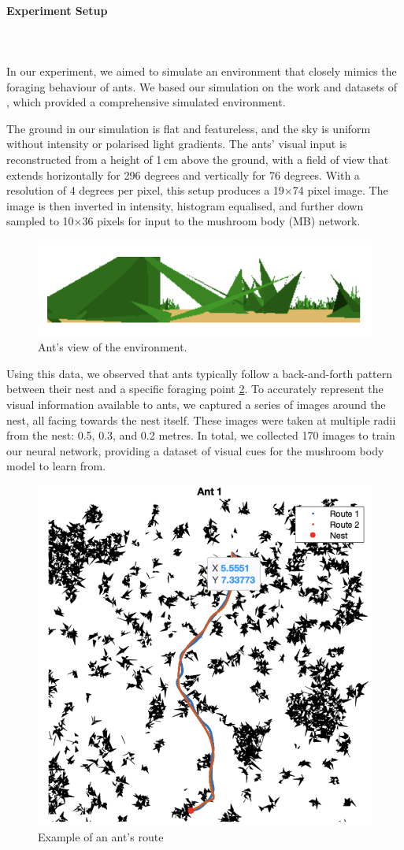 \documentclass[12pt,a4paper]{article}
\begin{document}
\paragraph{Experiment Setup}\\~\\
In our experiment, we aimed to simulate an environment that closely mimics the foraging behaviour of ants. We based our simulation on the work and datasets of \cite{ardin_peng_mangan_lagogiannis_webb_2016}, which provided a comprehensive simulated environment.

The ground in our simulation is flat and featureless, and the sky is uniform without intensity or polarised light gradients. The ants’ visual input is reconstructed from a height of 1 cm above the ground, with a field of view that extends horizontally for 296 degrees and vertically for 76 degrees. With a resolution of 4 degrees per pixel, this setup produces a 19×74 pixel image. The image is then inverted in intensity, histogram equalised, and further down sampled to 10×36 pixels for input to the mushroom body (MB) network.

\begin{figure}[htbp]
    \centering
    \includegraphics[width=0.5\linewidth]{a.png}
    \caption{Ant’s view of the environment.}
    \label{fig:ant_view}
\end{figure}

Using this data, we observed that ants typically follow a back-and-forth pattern between their nest and a specific foraging point \ref{ant_route}. To accurately represent the visual information available to ants, we captured a series of images around the nest, all facing towards the nest itself. These images were taken at multiple radii from the nest: 0.5, 0.3, and 0.2 metres. In total, we collected 170 images to train our neural network, providing a dataset of visual cues for the mushroom body model to learn from.

\begin{figure}[htbp]
    \centering
    \includegraphics[width=0.4\linewidth]{ant_route.png}
    \caption{Example of an ant's route}
    \label{ant_route}
\end{figure}
\end{document}
